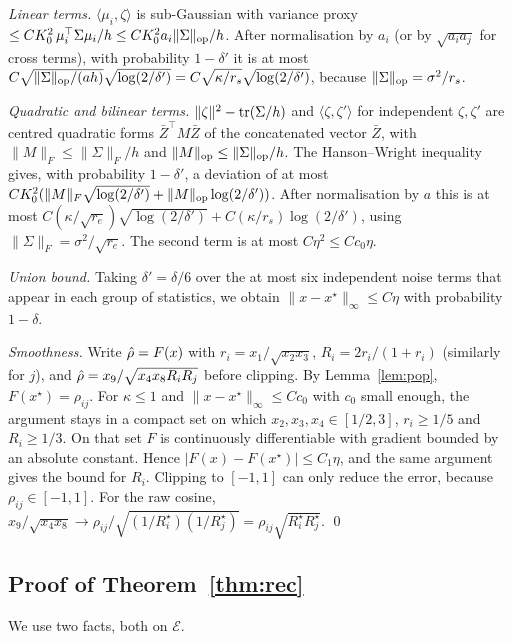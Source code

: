 \emph{Linear terms.} $\langle\mu_i,\zeta\rangle$ is sub-Gaussian with variance proxy $\le CK_0^2\,\mu_i^\top\Sigma\mu_i/h\le CK_0^2a_i\|\Sigma\|_{\mathrm{op}}/h$. After normalisation by $a_i$ (or by $\sqrt{a_ia_j}$ for cross terms), with probability $1-\delta'$ it is at most
$C\sqrt{\|\Sigma\|_{\mathrm{op}}/(ah)}\sqrt{\log(2/\delta')}=C\sqrt{\kappa/r_s}\sqrt{\log(2/\delta')}$, because $\|\Sigma\|_{\mathrm{op}}=\sigma^2/r_s$.

\emph{Quadratic and bilinear terms.} $\|\zeta\|^2-\operatorname{tr}(\Sigma/h)$ and $\langle\zeta,\zeta'\rangle$ for independent $\zeta,\zeta'$ are centred quadratic forms $\bar Z^\top M\bar Z$ of the concatenated vector $\bar Z$, with $\|M\|_F\le\|\Sigma\|_F/h$ and $\|M\|_{\mathrm{op}}\le\|\Sigma\|_{\mathrm{op}}/h$. The Hanson--Wright inequality~\citep{rudelson2013hansonwright} gives, with probability $1-\delta'$, a deviation of at most $C K_0^2(\|M\|_F\sqrt{\log(2/\delta')}+\|M\|_{\mathrm{op}}\log(2/\delta'))$. After normalisation by $a$ this is at most
$C(\kappa/\sqrt{r_e})\sqrt{\log(2/\delta')}+C(\kappa/r_s)\log(2/\delta')$, using $\|\Sigma\|_F=\sigma^2/\sqrt{r_e}$. The second term is at most $C\eta^2\le Cc_0\eta$.

\emph{Union bound.} Taking $\delta'=\delta/6$ over the at most six independent noise terms that appear in each group of statistics, we obtain $\|x-x^\star\|_\infty\le C\eta$ with probability $1-\delta$.

\emph{Smoothness.} Write $\hat\rho=F(x)$ with $r_i=x_1/\sqrt{x_2x_3}$, $R_i=2r_i/(1+r_i)$ (similarly for $j$), and $\hat\rho=x_9/\sqrt{x_4x_8R_iR_j}$ before clipping. By Lemma~\ref{lem:pop}, $F(x^\star)=\rho_{ij}$. For $\kappa\le1$ and $\|x-x^\star\|_\infty\le Cc_0$ with $c_0$ small enough, the argument stays in a compact set on which $x_2,x_3,x_4\in[1/2,3]$, $r_i\ge1/5$ and $R_i\ge1/3$. On that set $F$ is continuously differentiable with gradient bounded by an absolute constant. Hence $|F(x)-F(x^\star)|\le C_1\eta$, and the same argument gives the bound for $R_i$. Clipping to $[-1,1]$ can only reduce the error, because $\rho_{ij}\in[-1,1]$. For the raw cosine, $x_9/\sqrt{x_4x_8}\to\rho_{ij}/\sqrt{(1/R^\star_i)(1/R^\star_j)}=\rho_{ij}\sqrt{R_i^\star R_j^\star}$. \qed

\subsection{Proof of Theorem~\ref{thm:rec}}
We use two facts, both on $\mathcal E$.

